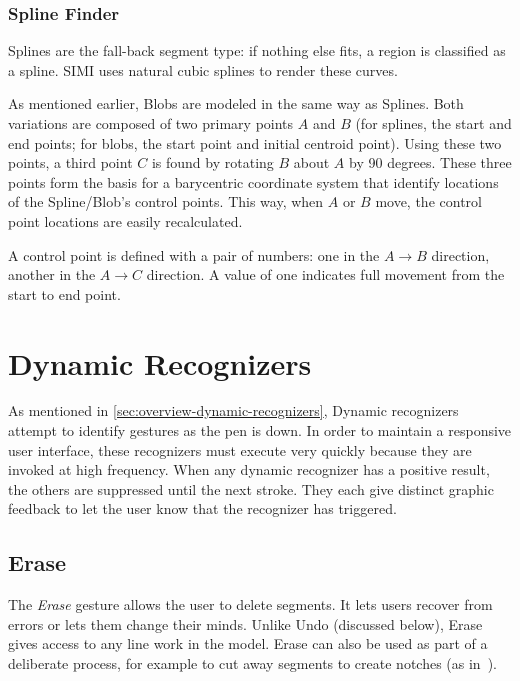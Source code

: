 \subsubsection{Spline Finder}

Splines are the fall-back segment type: if nothing else fits, a region
is classified as a spline. SIMI uses natural cubic splines to render
these curves.

As mentioned earlier, Blobs are modeled in the same way as
Splines. Both variations are composed of two primary points $A$ and
$B$ (for splines, the start and end points; for blobs, the start point
and initial centroid point). Using these two points, a third point $C$
is found by rotating $B$ about $A$ by 90 degrees. These three points
form the basis for a barycentric coordinate system that identify
locations of the Spline/Blob's control points. This way, when $A$ or
$B$ move, the control point locations are easily recalculated.

A control point is defined with a pair of numbers: one in the
$A\rightarrow B$ direction, another in the $A\rightarrow C$ direction. A
value of one indicates full movement from the start to end point.



\section{Dynamic Recognizers}

As mentioned in \ref{sec:overview-dynamic-recognizers}, Dynamic
recognizers attempt to identify gestures as the pen is down. In order
to maintain a responsive user interface, these recognizers must
execute very quickly because they are invoked at high frequency. When
any dynamic recognizer has a positive result, the others are
suppressed until the next stroke. They each give distinct graphic
feedback to let the user know that the recognizer has triggered.

\subsection{Erase}


The \textit{Erase} gesture allows the user to delete segments. It lets
users recover from errors or lets them change their minds. Unlike Undo
(discussed below), Erase gives access to any line work in the
model. Erase can also be used as part of a deliberate process, for
example to cut away segments to create notches (as
in~\cite{zeleznik-lineogrammer}).


